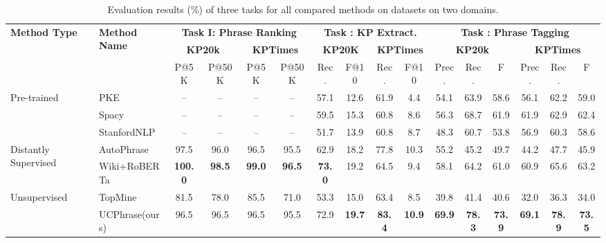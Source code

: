 \documentclass[sigconf]{acmart}
\newcommand{\our}{\mbox{UCPhrase}\xspace}
\newcommand{\Rom}[1]{\uppercase\expandafter{\romannumeral #1}}
\newcommand{\smtx}[1]{\scriptsize{#1}}
\begin{document}
\begin{table*}[]
    \centering
    \renewcommand\tabcolsep{2pt}
    \renewcommand\arraystretch{.85}
    \caption{Evaluation results (\%) of three tasks for all compared methods on datasets on two domains.}
    \label{tab:main}
    \small
    \begin{tabular}{ll cccc cccc  cccccc}
        \toprule
        \multirow{3}{*}{\textbf{Method Type}} & \multirow{3}{*}{\textbf{Method Name}} & \multicolumn{4}{c}{\textbf{Task I: Phrase Ranking}} & \multicolumn{4}{c}{\textbf{Task \Rom{2}: KP Extract.}} &  \multicolumn{6}{c}{\textbf{Task \Rom{3}: Phrase Tagging}}  \\
        \cmidrule(lr){3-6} \cmidrule(lr){7-10} \cmidrule(lr){11-16}
        & & \multicolumn{2}{c}{\textbf{KP20k}} & \multicolumn{2}{c}{\textbf{KPTimes}} & \multicolumn{2}{c}{\textbf{KP20K}} & \multicolumn{2}{c}{\textbf{KPTimes}} & \multicolumn{3}{c}{\textbf{KP20k}} & \multicolumn{3}{c}{\textbf{KPTimes}}\\
        \cmidrule(lr){3-4} \cmidrule(lr){5-6} \cmidrule(lr){7-8} \cmidrule(lr){9-10} \cmidrule(lr){11-13} \cmidrule(lr){14-16}
        & & P\smtx{@5K} & P\smtx{@50K} & P\smtx{@5K} & P\smtx{@50K} & Rec. & F\smtx{@10} & Rec. & F\smtx{@10} & Prec. & Rec. & F  & Prec. & Rec. & F \\
        \midrule
\multirow{3}{*}{Pre-trained} & PKE \cite{boudin2016pke}  & -- & -- & -- & -- & 57.1 & 12.6 & 61.9 & 4.4 & 54.1 & 63.9 & 58.6 & 56.1 & 62.2 & 59.0 \\
        & Spacy \cite{spacy} & -- & -- & -- & --  & 59.5 & 15.3 & 60.8 & 8.6 &  56.3 & 68.7 & 61.9 & 61.9 & 62.9 & 62.4\\
        & StanfordNLP \cite{manning2014stanford} & -- & -- & -- & -- & 51.7 & 13.9 & 60.8 & 8.7 & 48.3 & 60.7 & 53.8 & 56.9 & 60.3 & 58.6\\
         \midrule
\multirow{2}{*}{Distantly Supervised} & AutoPhrase \cite{shang2018automated} & 97.5 & 96.0 & 96.5 & 95.5 &  62.9 & 18.2 & 77.8 & 10.3 & 55.2 & 45.2 & 49.7 & 44.2 & 47.7 & 45.9\\
        & Wiki+RoBERTa & \textbf{100.0} & \textbf{98.5} & \textbf{99.0} & \textbf{96.5} & \textbf{73.0} & 19.2 & 64.5 & 9.4 & 58.1 & 64.2 & 61.0 & 60.9 & 65.6 & 63.2 \\
        \midrule
\multirow{2}{*}{Unsupervised} & TopMine \cite{el2014scalable} & 81.5 & 78.0 & 85.5 & 71.0 & 53.3 & 15.0 & 63.4 & 8.5 & 39.8 & 41.4 & 40.6 & 32.0 & 36.3 & 34.0 \\
        & \our (ours) & 96.5 & 96.5 & 96.5 & 95.5 & 72.9 & \textbf{19.7} & \textbf{83.4} & \textbf{10.9} & \textbf{69.9} & \textbf{78.3} & \textbf{73.9} & \textbf{69.1} & \textbf{78.9} & \textbf{73.5} \\
        \bottomrule
    \end{tabular}
    \vspace{-3mm}
\end{table*}
\end{document}
